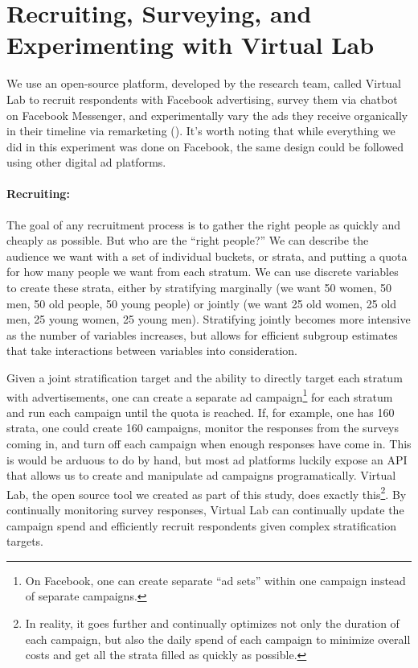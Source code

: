 \documentclass[a4paper,12pt]{article}
\begin{document}
\section{Recruiting, Surveying, and Experimenting with Virtual Lab} \label{recruiting-on-facebook}

We use an open-source platform, developed by the research team, called Virtual Lab to recruit respondents with Facebook advertising, survey them via chatbot on Facebook Messenger, and experimentally vary the ads they receive organically in their timeline via remarketing (\cite{Rao2020}). It's worth noting that while everything we did in this experiment was done on Facebook, the same design could be followed using other digital ad platforms.

\paragraph{Recruiting:} The goal of any recruitment process is to gather the right people as quickly and cheaply as possible. But who are the ``right people?'' We can describe the audience we want with a set of individual buckets, or strata, and putting a quota for how many people we want from each stratum. We can use discrete variables to create these strata, either by stratifying marginally (we want 50 women, 50 men, 50 old people, 50 young people) or jointly (we want 25 old women, 25 old men, 25 young women, 25 young men). Stratifying jointly becomes more intensive as the number of variables increases, but allows for efficient subgroup estimates that take interactions between variables into consideration.

Given a joint stratification target and the ability to directly target each stratum with advertisements, one can create a separate ad campaign\footnote{On Facebook, one can create separate ``ad sets'' within one campaign instead of separate campaigns.} for each stratum and run each campaign until the quota is reached. If, for example, one has 160 strata, one could create 160 campaigns, monitor the responses from the surveys coming in, and turn off each campaign when enough responses have come in. This is would be arduous to do by hand, but most ad platforms luckily expose an API that allows us to create and manipulate ad campaigns programatically. Virtual Lab, the open source tool we created as part of this study, does exactly this\footnote{In reality, it goes further and continually optimizes not only the duration of each campaign, but also the daily spend of each campaign to minimize overall costs and get all the strata filled as quickly as possible.}. By continually monitoring survey responses, Virtual Lab can continually update the campaign spend and efficiently recruit respondents given complex stratification targets.
\end{document}
